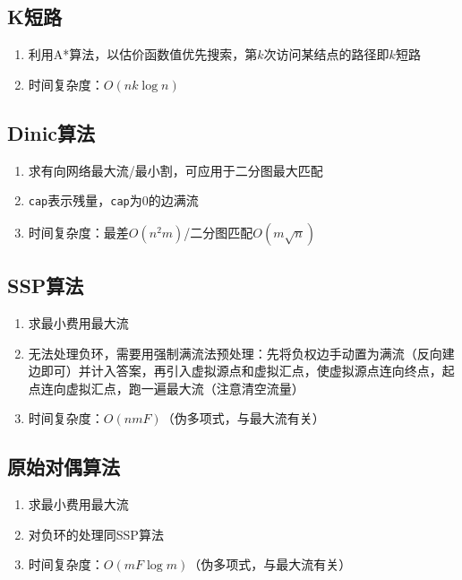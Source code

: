 \documentclass[twocolumn,a4,8pt]{article}  %
\begin{document}
		\subsection{K短路}
			\noindent\begin{enumerate}
				\item 利用A*算法，以估价函数值优先搜索，第$k$次访问某结点的路径即$k$短路
				\item 时间复杂度：$O(nk\log n)$
			\end{enumerate}
	 	 	
	 	 	
		\subsection{Dinic算法}
			\noindent\begin{enumerate}
				\item 求有向网络最大流/最小割，可应用于二分图最大匹配
				\item \texttt{cap}表示残量，\texttt{cap}为$0$的边满流
				\item 时间复杂度：最差$O(n^2m)$/二分图匹配$O(m\sqrt{n})$
			\end{enumerate}
	 	 	
	 	 	
		\subsection{SSP算法}
			\noindent\begin{enumerate}
				\item 求最小费用最大流
				\item 无法处理负环，需要用强制满流法预处理：先将负权边手动置为满流（反向建边即可）并计入答案，再引入虚拟源点和虚拟汇点，使虚拟源点连向终点，起点连向虚拟汇点，跑一遍最大流（注意清空流量）
				\item 时间复杂度：$O(nmF)$（伪多项式，与最大流有关）
			\end{enumerate}
	 	 	
	 	 	
		\subsection{原始对偶算法}
			\noindent\begin{enumerate}
				\item 求最小费用最大流
				\item 对负环的处理同SSP算法
				\item 时间复杂度：$O(mF\log m)$（伪多项式，与最大流有关）
			\end{enumerate}
	 	 	
	 	 	
\end{document}
